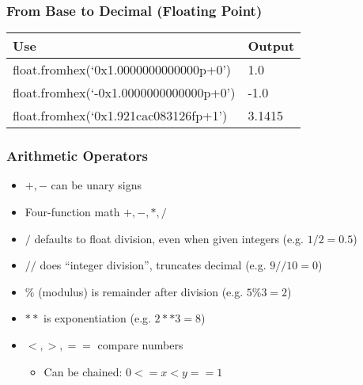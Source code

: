 \documentclass{beamer}
\begin{document}
\begin{frame}
  \frametitle{From Base to Decimal (Floating Point)}

  \begin{table}
    \begin{tabular}{l | l}
    Use          & Output   \\
    \hline
    float.fromhex(`0x1.0000000000000p+0')    &  1.0    \\
    float.fromhex(`-0x1.0000000000000p+0')   & -1.0    \\
    float.fromhex(`0x1.921cac083126fp+1')    &  3.1415 \\
    \end{tabular}
  \end{table}
\end{frame}

\begin{frame}
  \frametitle{Arithmetic Operators}

  \begin{itemize}
  \item $+, -$ can be unary signs
  \item Four-function math $+, -, *, /$
  \item $/$ defaults to float division, even when given integers (e.g. $1/2=0.5$)
  \item $//$ does ``integer division'', truncates decimal (e.g. $9//10=0$)
  \item $\%$ (modulus) is remainder after division (e.g. $5 \% 3 = 2$)
  \item $**$ is exponentiation (e.g. $2**3=8$)
  \item $<, >, ==$ compare numbers
    \begin{itemize}
      \item Can be chained: $0 <= x < y == 1$
    \end{itemize}
  \end{itemize}
\end{frame}
\end{document}
